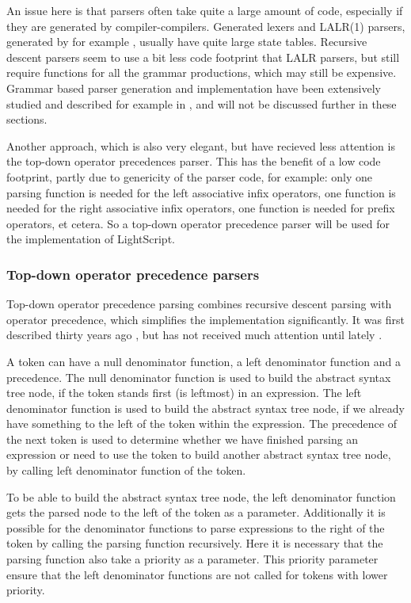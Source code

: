 \documentclass[11pt]{report}
\begin{document}
An issue here is that parsers often take quite a large amount of code, especially if they are generated by compiler-compilers.
Generated lexers and LALR(1) parsers, generated by for example \cite{yacc, yacc2}, usually have quite large state tables.
Recursive descent parsers seem to use a bit less code footprint that LALR parsers, but still require functions for all the grammar productions, which may still be expensive.
Grammar based parser generation and implementation have been extensively studied and described for example in  \cite{basics-of-compiler-design, grammar}, and will not be discussed further in these sections.

Another approach, which is also very elegant, 
but have recieved less attention is the
top-down operator precedences parser.
This has the benefit of a low code footprint,
partly due to genericity of the parser code,
for example: only one parsing
function is needed for the left associative infix operators,
one function is needed for the right associative infix operators,
one function is needed for prefix operators, et cetera.
So a top-down operator precedence parser will be used for the implementation of LightScript.


\subsubsection{Top-down operator precedence parsers}
\label{tdop}
Top-down operator precedence parsing combines recursive descent parsing with operator precedence, which simplifies the implementation significantly.
It was first described thirty years ago \cite{top-down-operator-precedence}, but has not received much attention until lately \cite{beautiful-code, crockford-tdop}.

A token can have a null denominator function, a left denominator function and a precedence.
The null denominator function is used to build the abstract syntax tree node, if the token stands first (is leftmost) in an expression.
The left denominator function is used to build the abstract syntax tree node, if we already have something to the left of the token within the expression.
The precedence of the next token is used to determine whether we have finished parsing an expression or need to use the token to build another abstract syntax tree node, by calling left denominator function of the token.

To be able to build the abstract syntax tree node, the left denominator function gets the parsed node to the left of the token as a parameter. Additionally it is possible for the denominator functions to parse expressions to the right of the token by calling the parsing function recursively. Here it is necessary that the parsing function also take a priority as a parameter. This priority parameter ensure that the left denominator functions are not called for tokens with lower priority.
\end{document}
